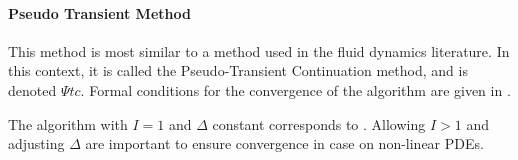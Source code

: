 \documentclass[english]{article}
\begin{document}
	\paragraph{Pseudo Transient Method} 	This method is most similar to a method used in the fluid dynamics literature. In this context, it is called the Pseudo-Transient Continuation method, and is denoted $\Psi tc$. Formal conditions for the convergence of the algorithm are given in  \citet{kelley1998convergence}.\par
	The algorithm with $I=1$ and $\Delta$ constant corresponds to \citet{achdou2014heterogeneous}. Allowing $I > 1$ and adjusting $\Delta$  are important to ensure convergence in case on non-linear PDEs.

	
	
\end{document}
